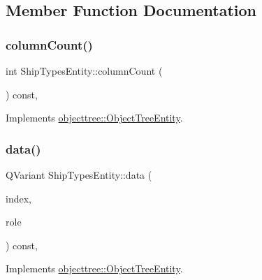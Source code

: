 \subsection{Member Function Documentation}
\mbox{\label{classobjecttree_1_1_ship_types_entity_a037bc899d5bf48e3bcdc13bc009b5238}} 
\subsubsection{\texorpdfstring{columnCount()}{columnCount()}}
{\footnotesize\ttfamily int Ship\+Types\+Entity\+::column\+Count (\begin{DoxyParamCaption}{ }\end{DoxyParamCaption}) const\hspace{0.3cm}{\ttfamily [override]}, {\ttfamily [virtual]}}



Implements \mbox{\hyperlink{classobjecttree_1_1_object_tree_entity_a70fd25eccf88b305e9db15fbe3daeae8}{objecttree\+::\+Object\+Tree\+Entity}}.

\mbox{\label{classobjecttree_1_1_ship_types_entity_a6f517c09c22c154d97a9f2c8b5c79c96}} 
\subsubsection{\texorpdfstring{data()}{data()}}
{\footnotesize\ttfamily Q\+Variant Ship\+Types\+Entity\+::data (\begin{DoxyParamCaption}\item[{const Q\+Model\+Index \&}]{index,  }\item[{int}]{role }\end{DoxyParamCaption}) const\hspace{0.3cm}{\ttfamily [override]}, {\ttfamily [virtual]}}



Implements \mbox{\hyperlink{classobjecttree_1_1_object_tree_entity_a2413c6573de18b451d97eb3800f10f35}{objecttree\+::\+Object\+Tree\+Entity}}.

\mbox{\label{classobjecttree_1_1_ship_types_entity_a382120055737f7e652bbd5584b9e034c}} 
